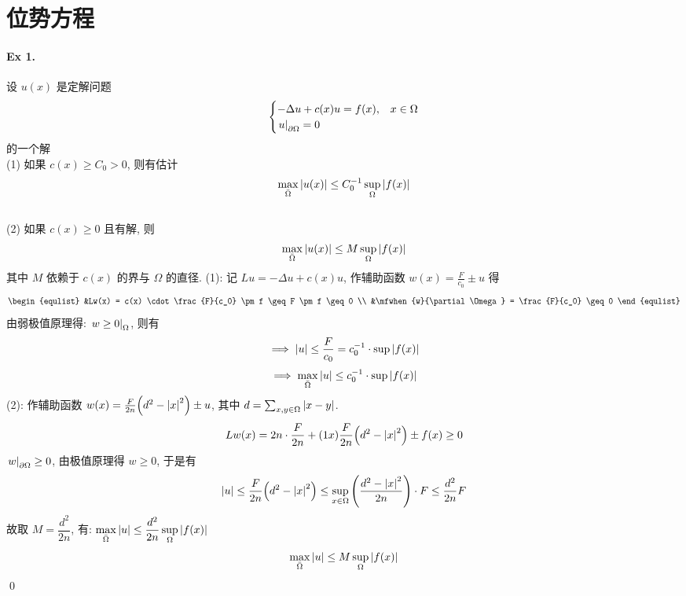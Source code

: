 \section{位势方程}
\paragraph{Ex 1.}
设 $u(x)$ 是定解问题
\[ \begin{cases}
-\Delta u + c(x) u = f(x), & x \in \Omega \\
{\left.{u} \right|}_{\partial \Omega} = 0
\end{cases} \]
的一个解 \\
(1) 如果 $c(x) \geq C_0 > 0$, 则有估计
\[ \max_{\bar\Omega}{\lvert {u(x)} \rvert} \leq C_0^{-1} \sup_{\Omega}{\lvert {f(x)} \rvert} \]\\
(2) 如果 $c(x) \geq 0$ 且有解, 则
\[ \max_{\bar\Omega}{\lvert {u(x)} \rvert} \leq M \sup_{\Omega}{\lvert {f(x)} \rvert} \]
其中 $M$ 依赖于 $c(x)$ 的界与 $\Omega$ 的直径.
\solution
\noindent (1): 记 $Lu = -\Delta u+c(x)u$, 作辅助函数 $w(x)=\frac F{c_0}\pm u$ 得
\[ \begin{equlist}
&Lw(x) = c(x) \cdot \frac{F}{c_0} \pm f \geq F \pm f \geq 0 \\
&\mfwhen{w}{\partial\Omega} = \frac{F}{c_0} \geq 0
\end{equlist} \]
由弱极值原理得: ${\left.{w\geq0} \right|}_{\Omega}$, 则有
\[\implies {\lvert {u} \rvert} \leq \frac{F}{c_0} = c_0^{-1} \cdot \sup{\lvert {f(x)} \rvert}\]
\[\implies \max_{\bar\Omega}{\lvert {u} \rvert}\leq c_0^{-1} \cdot \sup{\lvert {f(x)} \rvert}\]
\noindent (2): 作辅助函数 $w(x)=\frac F{2n}{\left( {d^2-{\lvert {x} \rvert}^2} \right)}\pm u$, 其中
$d = \sum_{x, y\in\Omega}{\lvert {x-y} \rvert}$.
\[
Lw(x) = 2n \cdot \frac{F}{2n} + (1x)\frac{F}{2n}{\left( {d^2-{\lvert {x} \rvert}^2} \right)} \pm
f(x) \geq 0
\]
${\left.{w} \right|}_{\partial\Omega}\geq0$, 由极值原理得 $w\geq0$, 于是有
\[{\lvert {u} \rvert}\leq\frac F{2n}{\left( {d^2-{\lvert {x} \rvert}^2} \right)}\leq\sup_{x\in\Omega}
{\left( {\frac{d^2-{\lvert {x} \rvert}^2}{2n}} \right)}\cdot F\leq\frac{d^2}{2n}F\]
故取 $M = \dfrac{d^2}{2n}$, 有:
$\max\limits_{\bar\Omega}{\lvert {u} \rvert}\leq\dfrac{d^2}{2n}\sup\limits_\Omega{\lvert {f(x)} \rvert}$
\[\max_{\bar\Omega}{\lvert {u} \rvert}\leq M\sup_\Omega{\lvert {f(x)} \rvert}\]
\qed


